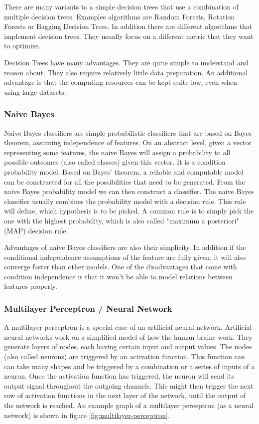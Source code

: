 There are many variants to a simple decision trees that use a combination of multiple decision trees. Examples algorithms are Random Forests, Rotation Forests or Bagging Decision Trees. In addition there are different algorithms that implement decision trees. They usually focus on a different metric that they want to optimize. 

Decision Trees have many advantages. They are quite simple to understand and reason about. They also require relatively little data preparation. An additional advantage is that the computing resources can be kept quite low, even when using large datasets.


\subsubsection{Naive Bayes}
Naive Bayes classifiers are simple probabilistic classifiers that are based on Bayes theorem, assuming independence of features. On an abstract level, given a vector representing some features, the naive Bayes will assign a probability to all possible outcomes (also called classes) given this vector. It is a condition probability model. Based on Bayes' theorem, a reliable and computable model can be constructed for all the possibilities that need to be generated. From the naive Bayes probability model we can then construct a classifier. The naive Bayes classifier usually combines the probability model with a decision rule. This rule will define, which hypothesis is to be picked. A common rule is to simply pick the one with the highest probability, which is also called "maximum a posteriori" (MAP) decision rule.

Advantages of naive Bayes classifiers are also their simplicity. In addition if the conditional independence assumptions of the feature are fully given, it will also converge faster than other models. One of the disadvantages that come with condition independence is that it won't be able to model relations between features properly.


\subsubsection{Multilayer Perceptron / Neural Network}
A multilayer perceptron is a special case of an artificial neural network. Artificial neural networks work on a simplified model of how the human brains work. They generate layers of nodes, each having certain input and output values. The nodes (also called neurons) are triggered by an activation function. This function can can take many shapes and be triggered by a combination or a series of inputs of a neuron. Once the activation function has triggered, the neuron will send its output signal throughout the outgoing channels. This might then trigger the next row of activation functions in the next layer of the network, until the output of the network is reached. An example graph of a multilayer perceptron (as a neural network) is shown in figure \ref{fig:multilayer-perceptron}.

